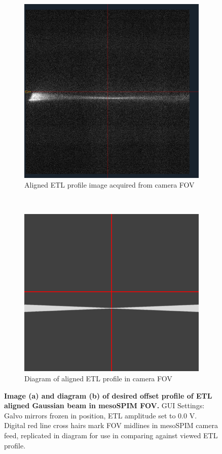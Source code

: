 \begin{figure}[H]
    \centering
    \begin{subfigure}[t]{0.4\textwidth}
    \centering
    \includegraphics[width=0.9\linewidth]{Images/Ideal_ETL.png}
    \caption{Aligned ETL profile image acquired from camera FOV} 
    \end{subfigure}
    \medskip
    ~    
    \medskip
    \begin{subfigure}[t]{0.4\textwidth}
    \centering
    \includegraphics[width=1\linewidth]{Figures/ETL_Profile_TEMP.png}
    \caption{Diagram of aligned ETL profile in camera FOV}
    \end{subfigure}
    \caption{\textbf{Image (a) and diagram (b) of desired offset profile of ETL aligned Gaussian beam in mesoSPIM FOV.} GUI Settings: Galvo mirrors frozen in position, ETL amplitude set to 0.0 V. Digital red line cross hairs mark FOV midlines in mesoSPIM camera feed, replicated in diagram for use in comparing against viewed ETL profile.}
    
\end{figure}

